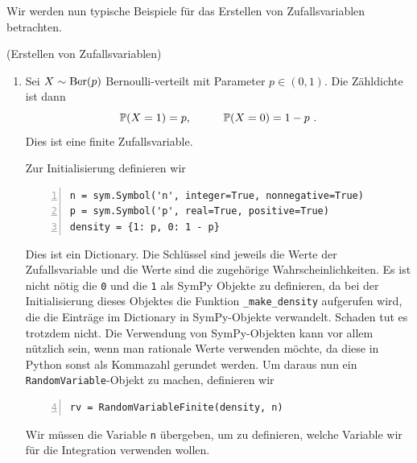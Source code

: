 Wir werden nun typische Beispiele für das Erstellen von Zufallsvariablen betrachten.

\begin{Beispiel}{(Erstellen von Zufallsvariablen)}
\hypertarget{Bsp:Erstellung}{}
\begin{enumerate}[label=(\roman*)]
\item Sei $X \sim \operatorname{Ber}(p)$ Bernoulli-verteilt mit Parameter $p \in (0, 1)$. Die Zähldichte ist dann
\[\mathbb{P}(X = 1) = p, \hspace*{1cm} \mathbb{P}(X = 0) = 1 - p~.\]
Dies ist eine finite Zufallsvariable.

\newpage

Zur Initialisierung definieren wir
\begin{lstlisting}[numbers=left, numberstyle=\tiny\color{codegray}]
n = sym.Symbol('n', integer=True, nonnegative=True)
p = sym.Symbol('p', real=True, positive=True)
density = {1: p, 0: 1 - p}
\end{lstlisting}
Dies ist ein Dictionary. Die Schlüssel  sind jeweils die Werte der Zufallsvariable und die Werte  sind die zugehörige Wahrscheinlichkeiten. Es ist nicht nötig die \lstinline|0| und die \lstinline|1| als SymPy Objekte zu definieren, da bei der Initialisierung dieses Objektes die Funktion \lstinline|_make_density| aufgerufen wird, die die Einträge im Dictionary in SymPy-Objekte verwandelt. Schaden tut es trotzdem nicht. Die Verwendung von SymPy-Objekten kann vor allem nützlich sein, wenn man rationale Werte verwenden möchte, da diese in Python sonst als Kommazahl gerundet werden. Um daraus nun ein \lstinline|RandomVariable|-Objekt zu machen, definieren wir
\begin{lstlisting}[numbers=left, numberstyle=\tiny\color{codegray}, firstnumber=4]
rv = RandomVariableFinite(density, n)
\end{lstlisting}
Wir müssen die Variable \lstinline|n| übergeben, um zu definieren, welche Variable wir für die Integration verwenden wollen.


\end{enumerate}
\end{Beispiel}
